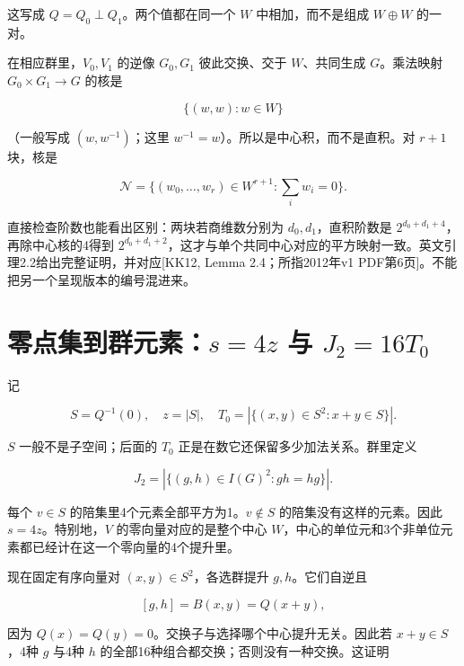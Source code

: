 \documentclass[UTF8,fontset=fandol,zihao=-4,openany,oneside]{ctexbook}
\begin{document}
这写成 \(Q=Q_0\perp Q_1\)。两个值都在同一个 \(W\) 中相加，而不是组成 \(W\oplus W\) 的一对。



在相应群里，\(V_0,V_1\) 的逆像 \(G_0,G_1\) 彼此交换、交于 \(W\)、共同生成 \(G\)。乘法映射 \(G_0\times G_1\to G\) 的核是



\[
\{(w,w):w\in W\}
\]



（一般写成 \((w,w^{-1})\)；这里 \(w^{-1}=w\)）。所以是中心积，而不是直积。对 \(r+1\) 块，核是



\[
\mathcal N=\{(w_0,\ldots,w_r)\in W^{r+1}:\textstyle\sum_iw_i=0\}.
\]



直接检查阶数也能看出区别：两块若商维数分别为 \(d_0,d_1\)，直积阶数是 \(2^{d_0+d_1+4}\)，再除中心核的4得到 \(2^{d_0+d_1+2}\)，这才与单个共同中心对应的平方映射一致。英文引理2.2给出完整证明，并对应[KK12, Lemma 2.4；所指2012年v1 PDF第6页]。不能把另一个呈现版本的编号混进来。



\section{零点集到群元素：\texorpdfstring{\(s=4z\)}{s=4z} 与 \texorpdfstring{\(J_2=16T_0\)}{J2=16T0}}


记



\[
S=Q^{-1}(0),\quad z=|S|,
\quad T_0=|\{(x,y)\in S^2:x+y\in S\}|.
\]



\(S\) 一般不是子空间；后面的 \(T_0\) 正是在数它还保留多少加法关系。群里定义



\[
J_2=|\{(g,h)\in I(G)^2:gh=hg\}|.
\]



每个 \(v\in S\) 的陪集里4个元素全部平方为1。\(v\notin S\) 的陪集没有这样的元素。因此 \(s=4z\)。特别地，\(V\) 的零向量对应的是整个中心 \(W\)，中心的单位元和3个非单位元素都已经计在这一个零向量的4个提升里。



现在固定有序向量对 \((x,y)\in S^2\)，各选群提升 \(g,h\)。它们自逆且



\[
[g,h]=B(x,y)=Q(x+y),
\]



因为 \(Q(x)=Q(y)=0\)。交换子与选择哪个中心提升无关。因此若 \(x+y\in S\)，4种 \(g\) 与4种 \(h\) 的全部16种组合都交换；否则没有一种交换。这证明
\end{document}

